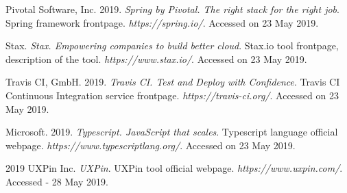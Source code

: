 \documentclass[licencjacka,en]{thesisclass}
\begin{document}
\begin{thebibliography}{99}
        Pivotal Software, Inc. 2019.
        \textit{Spring by Pivotal. The right stack for the right job}.
        Spring framework frontpage.
        \textit{https://spring.io/}.
        Accessed on 23 May 2019.

        Stax.
        \textit{Stax. Empowering companies to build better cloud}.
        Stax.io tool frontpage, description of the tool.
        \textit{https://www.stax.io/}.
        Accessed on 23 May 2019.

        Travis CI, GmbH. 2019.
        \textit{Travis CI. Test and Deploy with Confidence}.
        Travis CI Continuous Integration service frontpage.
        \textit{https://travis-ci.org/}.
        Accessed on 23 May 2019.

        Microsoft. 2019.
        \textit{Typescript. JavaScript that scales}.
        Typescript language official webpage.
        \textit{https://www.typescriptlang.org/}.
        Accessed on 23 May 2019.

        2019 UXPin Inc.
        \textit{UXPin}.
        UXPin tool official webpage.
        \textit{https://www.uxpin.com/}.
        Accessed - 28 May 2019.

    \end{thebibliography}
\end{document}
